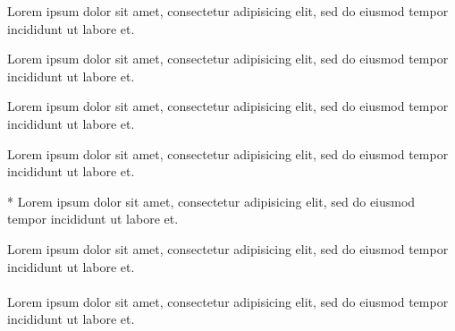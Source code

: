 \documentclass{article}
\begin{document}


\begin{clozebox}
Lorem ipsum dolor sit amet, consectetur adipisicing elit, sed do eiusmod
tempor incididunt ut labore et.
\end{clozebox}


\clozereset

\begin{clozebox}[boxwidth=5cm]
Lorem ipsum dolor sit amet, consectetur adipisicing elit, sed do eiusmod
tempor incididunt ut labore et.
\end{clozebox}


\clozereset

\begin{clozebox}[boxwidth=5cm,boxheight=5cm]
Lorem ipsum dolor sit amet, consectetur adipisicing elit, sed do eiusmod
tempor incididunt ut labore et.
\end{clozebox}


\clozereset

\begin{clozebox}[box_rule=0.2cm,hide]
Lorem ipsum dolor sit amet, consectetur adipisicing elit, sed do eiusmod
tempor incididunt ut labore et.
\end{clozebox}


\begin{clozebox}*
Lorem ipsum dolor sit amet, consectetur adipisicing elit, sed do eiusmod
tempor incididunt ut labore et.
\end{clozebox}


\begin{clozebox}
\noindent
Lorem ipsum dolor sit amet, consectetur adipisicing elit, sed do eiusmod
tempor incididunt ut labore et.\\\\
%
Lorem ipsum dolor sit amet, consectetur adipisicing elit, sed do eiusmod
tempor incididunt ut labore et.
\end{clozebox}
\end{document}
